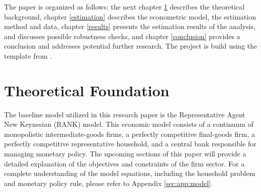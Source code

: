 \documentclass[11pt, a4paper, leqno]{article}
\begin{document}
The paper is organized as follows: the next chapter \ref{theory} describes the theoretical background, chapter \ref{estimation} describes the econometric model, the estimation method and data, chapter \ref{results} presents the estimation results of the analysis, and discusses possible robustness checks, and chapter \ref{conclusion} provides a conclusion and addresses potential further research. The project is build using the template from \citet{GaudeckerEconProjectTemplates}.



\section{Theoretical Foundation} \label{theory}
The baseline model utilized in this research paper is the Representative Agent New Keynesian (RANK) model. This economic model consists of a continuum of monopolistic intermediate-goods firms, a perfectly competitive final-goods firm, a perfectly competitive representative household, and a central bank responsible for managing monetary policy. The upcoming sections of this paper will provide a detailed explanation of the objectives and constraints of the firm sector. For a complete understanding of the model equations, including the household problem and monetary policy rule, please refer to Appendix \ref{sec:app:model}.
\end{document}
